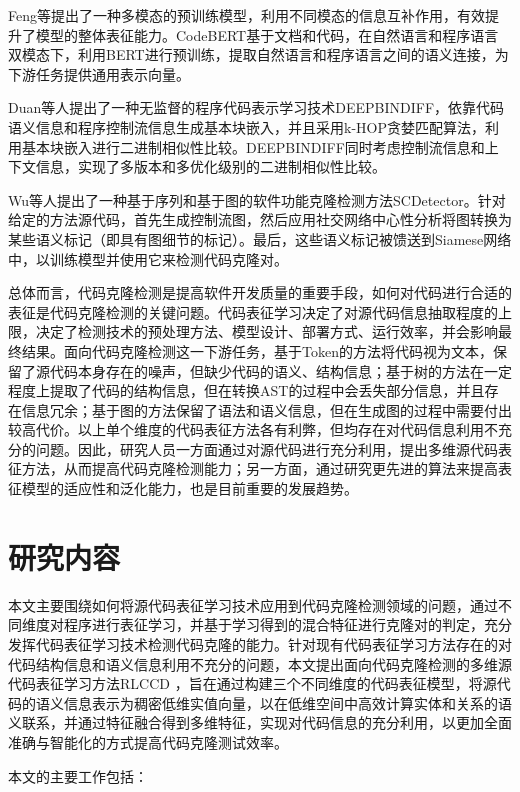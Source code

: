 Feng等\cite{Feng2020CodeBERTAP}提出了一种多模态的预训练模型，利用不同模态的信息互补作用，有效提升了模型的整体表征能力。CodeBERT基于文档和代码，在自然语言和程序语言双模态下，利用BERT进行预训练，提取自然语言和程序语言之间的语义连接，为下游任务提供通用表示向量。

Duan等人\cite{WOS:000680742600067}提出了一种无监督的程序代码表示学习技术DEEPBINDIFF，依靠代码语义信息和程序控制流信息生成基本块嵌入，并且采用k-HOP贪婪匹配算法，利用基本块嵌入进行二进制相似性比较。DEEPBINDIFF同时考虑控制流信息和上下文信息，实现了多版本和多优化级别的二进制相似性比较。

Wu等人\cite{10.1145/3324884.3416562}提出了一种基于序列和基于图的软件功能克隆检测方法SCDetector。针对给定的方法源代码，首先生成控制流图，然后应用社交网络中心性分析将图转换为某些语义标记（即具有图细节的标记）。最后，这些语义标记被馈送到Siamese网络中，以训练模型并使用它来检测代码克隆对。

总体而言，代码克隆检测是提高软件开发质量的重要手段，如何对代码进行合适的表征是代码克隆检测的关键问题\cite{JSYJ20240123005}。代码表征学习决定了对源代码信息抽取程度的上限，决定了检测技术的预处理方法、模型设计、部署方式、运行效率，并会影响最终结果。面向代码克隆检测这一下游任务，基于Token的方法将代码视为文本，保留了源代码本身存在的噪声，但缺少代码的语义、结构信息；基于树的方法在一定程度上提取了代码的结构信息，但在转换AST的过程中会丢失部分信息，并且存在信息冗余；基于图的方法保留了语法和语义信息，但在生成图的过程中需要付出较高代价。以上单个维度的代码表征方法各有利弊，但均存在对代码信息利用不充分的问题。因此，研究人员一方面通过对源代码进行充分利用，提出多维源代码表征方法，从而提高代码克隆检测能力；另一方面，通过研究更先进的算法来提高表征模型的适应性和泛化能力，也是目前重要的发展趋势。

\section{研究内容}
\label{sec:Content}
本文主要围绕如何将源代码表征学习技术应用到代码克隆检测领域的问题，通过不同维度对程序进行表征学习，并基于学习得到的混合特征进行克隆对的判定，充分发挥代码表征学习技术检测代码克隆的能力。针对现有代码表征学习方法存在的对代码结构信息和语义信息利用不充分的问题，本文提出面向代码克隆检测的多维源代码表征学习方法RLCCD ，旨在通过构建三个不同维度的代码表征模型，将源代码的语义信息表示为稠密低维实值向量，以在低维空间中高效计算实体和关系的语义联系，并通过特征融合得到多维特征，实现对代码信息的充分利用，以更加全面准确与智能化的方式提高代码克隆测试效率。

本文的主要工作包括：

